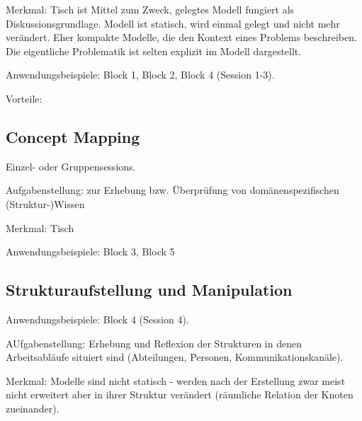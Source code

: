 Merkmal: Tisch ist Mittel zum Zweck, gelegtes Modell fungiert als Diskussionsgrundlage. Modell ist statisch, wird einmal gelegt und nicht mehr verändert. Eher kompakte Modelle, die den Kontext eines Problems beschreiben. Die eigentliche Problematik ist selten explizit im Modell dargestellt.

Anwendungsbeispiele: Block 1, Block 2, Block 4 (Session 1-3).

Vorteile:

\subsection{Concept Mapping}

Einzel- oder Gruppensessions. 

Aufgabenstellung: zur Erhebung bzw. Überprüfung von domänenspezifischen (Struktur-)Wissen

Merkmal: Tisch 

Anwendungsbeispiele: Block 3, Block 5

\subsection{Strukturaufstellung und Manipulation}

Anwendungsbeispiele: Block 4 (Session 4).

AUfgabenstellung: Erhebung und Reflexion der Strukturen in denen Arbeitsabläufe situiert sind (Abteilungen, Personen, Kommunikationskanäle).

Merkmal: Modelle sind nicht statisch - werden nach der Erstellung zwar meist nicht erweitert aber in ihrer Struktur verändert (räumliche Relation der Knoten zueinander). 

